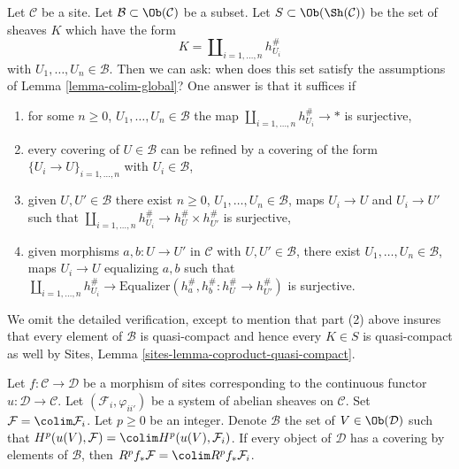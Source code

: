 \begin{remark}
\label{remark-colim-global}
Let $\mathcal{C}$ be a site. Let $\mathcal{B} \subset \Ob(\mathcal{C})$
be a subset. Let $S \subset \Ob(\Sh(\mathcal{C}))$
be the set of sheaves $K$ which have the form
$$
K = \coprod\nolimits_{i = 1, \ldots, n} h_{U_i}^\#
$$
with $U_1, \ldots, U_n \in \mathcal{B}$. Then we can
ask: when does this set satisfy the assumptions of
Lemma \ref{lemma-colim-global}? One answer is that it suffices if
\begin{enumerate}
\item for some $n \geq 0$, $U_1, \ldots, U_n \in \mathcal{B}$
the map $\coprod_{i = 1, \ldots, n} h_{U_i}^\# \to *$ is surjective,
\item every covering of $U \in \mathcal{B}$ can be refined
by a covering of the form $\{U_i \to U\}_{i = 1, \ldots, n}$
with $U_i \in \mathcal{B}$,
\item given $U, U' \in \mathcal{B}$ there exist $n \geq 0$,
$U_1, \ldots, U_n \in \mathcal{B}$, maps $U_i \to U$ and
$U_i \to U'$ such that $\coprod_{i = 1, \ldots, n} h_{U_i}^\# \to
h_U^\# \times h_{U'}^\#$ is surjective,
\item given morphisms $a, b : U \to U'$ in $\mathcal{C}$ with
$U, U' \in \mathcal{B}$, there exist $U_1, \ldots, U_n \in \mathcal{B}$,
maps $U_i \to U$ equalizing $a, b$ such that
$\coprod_{i = 1, \ldots, n} h_{U_i}^\# \to
\text{Equalizer}(h_a^\#, h_b^\# : h_U^\# \to h_{U'}^\#)$
is surjective.
\end{enumerate}
We omit the detailed verification, except to mention that part (2)
above insures that every element of $\mathcal{B}$ is quasi-compact
and hence every $K \in S$ is quasi-compact as well by
Sites, Lemma \ref{sites-lemma-coproduct-quasi-compact}.
\end{remark}

\begin{lemma}
\label{lemma-higher-direct-image-colimit}
Let $f : \mathcal{C} \to \mathcal{D}$ be a morphism of sites
corresponding to the continuous functor $u : \mathcal{D} \to \mathcal{C}$.
Let $(\mathcal{F}_i, \varphi_{ii'})$ be a system of
abelian sheaves on $\mathcal{C}$. Set $\mathcal{F} = \colim \mathcal{F}_i$.
Let $p \geq 0$ be an integer. Denote $\mathcal{B}$ the set of
$V \in \Ob(\mathcal{D})$ such that
$H^p(u(V), \mathcal{F}) = \colim H^p(u(V), \mathcal{F}_i)$.
If every object of $\mathcal{D}$ has a covering by elements of $\mathcal{B}$,
then $R^pf_*\mathcal{F} = \colim R^pf_*\mathcal{F}_i$.
\end{lemma}

